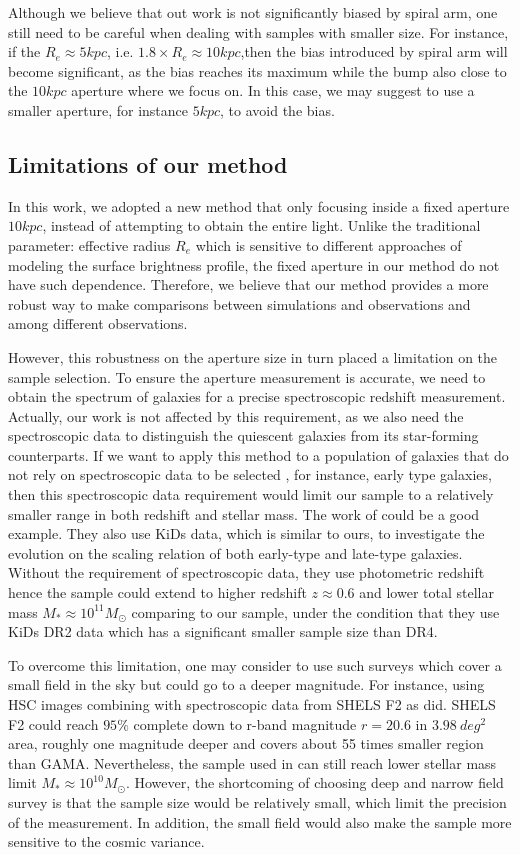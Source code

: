\documentclass[fleqn,usenatbib]{mnras}
\begin{document}
\par Although we believe that out work is not significantly biased by spiral arm, one still need to be careful when dealing with samples with smaller size. For instance, if the $R_e \approx 5kpc$, i.e. $1.8 \times R_e \approx 10kpc$,then the bias introduced by spiral arm will become significant, as the bias reaches its maximum while the bump also close to the $10kpc$ aperture where we focus on. In this case, we may suggest to use a smaller aperture, for instance $5kpc$, to avoid the bias.  
\subsection{Limitations of our method}
In this work, we adopted a new method that only focusing inside a fixed aperture $10kpc$, instead of attempting to obtain the entire light. Unlike the traditional parameter: effective radius $R_e$ which is sensitive to different approaches of modeling the surface brightness profile, the fixed aperture in our method do not have such dependence. Therefore, we believe that our method provides a more robust way to make comparisons between simulations and observations and among different observations. 
\par However, this robustness on the aperture size in turn placed a limitation on the sample selection. To ensure the aperture measurement is accurate, we need to obtain the spectrum of galaxies for a precise spectroscopic redshift measurement. Actually, our work is not affected by this requirement, as we also need the spectroscopic data to distinguish the quiescent galaxies from its star-forming counterparts. If we want to apply this method to a population of galaxies that do not rely on spectroscopic data to be selected , for instance, early type galaxies, then this spectroscopic data requirement would limit our sample to a relatively smaller range in both redshift and stellar mass. The work of  \cite{KiDs_Roy} could be a good example. They also use KiDs data, which is similar to ours, to investigate the evolution on the scaling relation of both early-type and late-type galaxies. Without the requirement of spectroscopic data, they use photometric redshift hence the sample could extend to higher redshift $z \approx 0.6$ and lower total stellar mass $M_* \approx 10^{11} M_{\odot}$ comparing to our sample, under the condition that they use KiDs DR2 data which has a significant smaller sample size than DR4.
\par To overcome this limitation, one may consider to use such surveys which cover a small field in the sky but could go to a deeper magnitude. For instance, using HSC \citep{HSC16} images combining with spectroscopic data from SHELS F2 \citep{Geller14} as \cite{damjanov2019} did. SHELS F2 could reach $95\%$ complete down to r-band magnitude $r = 20.6$ in $3.98~deg^2$ area, roughly one magnitude deeper and covers about 55 times smaller region than GAMA. Nevertheless, the sample used in \cite{damjanov2019} can still reach lower stellar mass limit $M_* \approx 10^{10} M_{\odot}$. However, the shortcoming of choosing deep and narrow field survey is that the sample size would be relatively small, which limit the precision of the measurement. In addition, the small field would also make the sample more sensitive to the cosmic variance.
\end{document}
